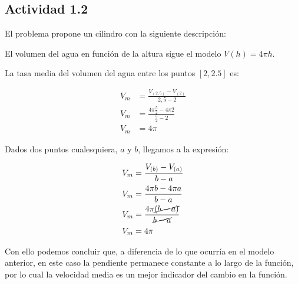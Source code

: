 \subsection*{Actividad 1.2}

El problema propone un cilindro con la siguiente descripción:

\begin{center}
\end{center}

El volumen del agua en función de la altura sigue el modelo $V(h) = 4\pi h$. 

La tasa media del volumen del agua entre los puntos $[2,2.5]$ es:

\begin{align*}
    V_m &= \frac{V_{(2,5)} - V_{(2)}}{2,5-2}\\
    V_m &= \frac{4\pi\frac{5}{2} - 4\pi 2}{\frac{5}{2}-2}\\
    V_m &= 4\pi
\end{align*}

Dados dos puntos cualesquiera, $a$ y $b$, llegamos a la expresión:

\begin{align*}
    V_m &= \frac{V_{(b)} - V_{(a)}}{b-a}\\
    V_m &= \frac{4\pi b - 4\pi a}{b-a}\\
    V_m &= \frac{4\pi \cancel{(b - a)}}{\cancel{b-a}}\\
    V_m &= 4\pi
\end{align*}

Con ello podemos concluir que, a diferencia de lo que ocurría en el modelo anterior, 
en este caso la pendiente permanece constante a lo largo de la función, 
por lo cual la velocidad media es un mejor indicador del cambio en la función.